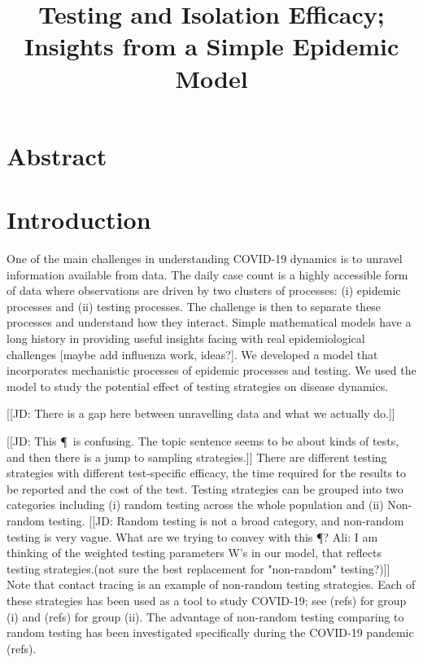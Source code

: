 \documentclass[12pt]{article}
\title{Testing and Isolation Efficacy; Insights from a Simple Epidemic Model }
\theoremstyle{definition} %
\begin{document}
\maketitle

\section{Abstract}

\section{Introduction}

One of the main challenges in understanding COVID-19 dynamics is to unravel information available from data. The daily case count is a highly accessible form of data where observations are driven by two clusters of processes: (i) epidemic processes and (ii) testing processes. The challenge is then to separate these processes and understand how they interact. Simple mathematical models have a long history in providing useful insights facing with real epidemiological challenges \citep{ross1911prevention} [maybe add influenza work, ideas?]. We developed a model that incorporates mechanistic processes of epidemic processes and testing. We used the model to study the potential effect of testing strategies on disease dynamics. 

[[JD: There is a gap here between unravelling data and what we actually do.]]

[[JD: This \P\ is confusing. The topic sentence seems to be about kinds of tests, and then there is a jump to sampling strategies.]]
There are different testing strategies with different test-specific efficacy, the time required for the results to be reported and the cost of the test. Testing strategies can be grouped into two categories including (i) random testing across the whole population and (ii) Non-random testing. [[JD: Random testing is not a broad category, and non-random testing is very vague. What are we trying to convey with this \P? Ali: I am thinking of the weighted testing parameters W's in our model, that reflects testing strategies.(not sure the best replacement for "non-random" testing?)]] Note that contact tracing is an example of non-random testing strategies. Each of these strategies has been used as a tool to study COVID-19; see (refs) for group (i) and (refs) for group (ii). The advantage of non-random testing comparing to random testing has been investigated specifically during the COVID-19 pandemic (refs). 
\end{document}
